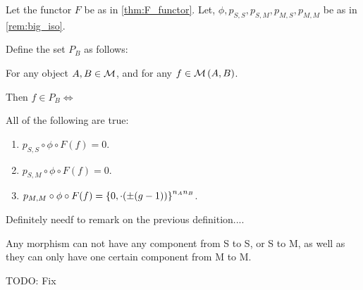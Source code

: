\begin{definition} \label{def:unholy} %
    Let the functor \( F \) be as in \autoref{thm:F_functor}.  Let, \( \phi, p_{S, S}, p_{S, M}, p_{M, S}, p_{M, M} \) be as in \autoref{rem:big_iso}.

    Define the set \( P_B \) as follows:

    For any object \( A, B \in {\mathcal{M}} \), and for any \( f \in {\mathcal{M}}\left( A, B \right) \).

    Then \( f \in P_B \iff \)

    All of the following are true:
    \begin{enumerate}
        \item {
            \( p_{S, S} \circ \phi \circ F(f) = 0 \).
        }
        \item {
            \( p_{S, M} \circ \phi \circ F(f) = 0 \).
        }
        \item {
            \( p_{M, M} \circ \phi \circ F(f) = \left\{ 0, \cdot(\pm (g - 1)) \right\}^{n_An_B} \).
        }
    \end{enumerate}
\end{definition}

\begin{remark}
    Definitely needf to remark on the previous definition.... 
    
    Any morphism can not have any component from S to S, or S to M, as well as they can only have one certain component from M to M.

    TODO: Fix
\end{remark}


